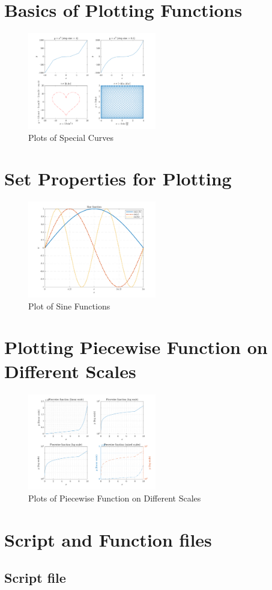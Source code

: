 \section{Basics of Plotting Functions}
\begin{figure}[!htbp]
    \centering
    \includegraphics[width=0.5\textwidth]{../src/lab_04_plot_1.pdf}
    \caption{Plots of Special Curves}
    \label{fig:special_curves}
\end{figure}

\newpage
\section{Set Properties for Plotting}
\begin{figure}[!htbp]
    \centering
    \includegraphics[width=0.5\textwidth]{../src/lab_04_plot_2.pdf}
    \caption{Plot of Sine Functions}
    \label{fig:sine_functions}
\end{figure}

\newpage
\section{Plotting Piecewise Function on Different Scales}
\begin{figure}[!htbp]
    \centering
    \includegraphics[width=0.5\textwidth]{../src/lab_04_plot_3.pdf}
    \caption{Plots of Piecewise Function on Different Scales}
    \label{fig:piecewise}
\end{figure}

\newpage
\section{Script and Function files}
\subsection{Script file}

